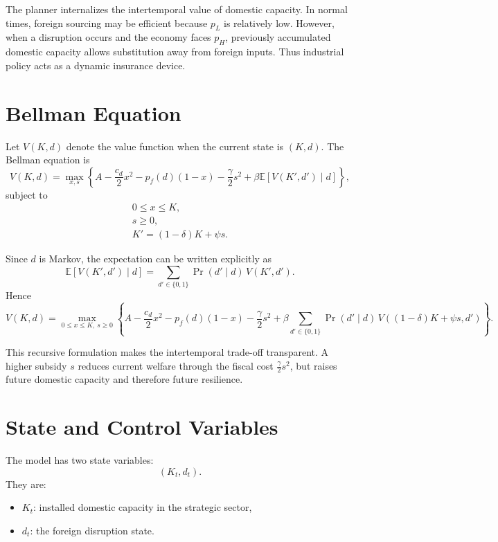 \documentclass[11pt]{article}
\begin{document}
The planner internalizes the intertemporal value of domestic capacity. In normal times, foreign sourcing may be efficient because $p_L$ is relatively low. However, when a disruption occurs and the economy faces $p_H$, previously accumulated domestic capacity allows substitution away from foreign inputs. Thus industrial policy acts as a dynamic insurance device.

\section{Bellman Equation}

Let $V(K,d)$ denote the value function when the current state is $(K,d)$. The Bellman equation is
\begin{equation}
V(K,d)
=
\max_{x,s}
\left\{
A-\frac{c_d}{2}x^2-p_f(d)(1-x)-\frac{\gamma}{2}s^2
+\beta \mathbb{E}\left[V(K',d')\mid d\right]
\right\},
\end{equation}
subject to
\begin{align}
0 \le x \le K, \\
s \ge 0, \\
K'=(1-\delta)K+\psi s.
\end{align}

Since $d$ is Markov, the expectation can be written explicitly as
\begin{equation}
\mathbb{E}\left[V(K',d')\mid d\right]
=
\sum_{d'\in\{0,1\}}
\Pr(d' \mid d)\,V(K',d').
\end{equation}
Hence
\begin{equation}
V(K,d)
=
\max_{0\le x\le K,\ s\ge 0}
\left\{
A-\frac{c_d}{2}x^2-p_f(d)(1-x)-\frac{\gamma}{2}s^2
+\beta
\sum_{d'\in\{0,1\}}
\Pr(d'\mid d)\,
V\!\left((1-\delta)K+\psi s,d'\right)
\right\}.
\end{equation}

This recursive formulation makes the intertemporal trade-off transparent. A higher subsidy $s$ reduces current welfare through the fiscal cost $\frac{\gamma}{2}s^2$, but raises future domestic capacity and therefore future resilience.

\section{State and Control Variables}

The model has two state variables:
\begin{equation}
(K_t,d_t).
\end{equation}
They are:
\begin{itemize}[leftmargin=2em]
    \item $K_t$: installed domestic capacity in the strategic sector,
    \item $d_t$: the foreign disruption state.
\end{itemize}
\end{document}
